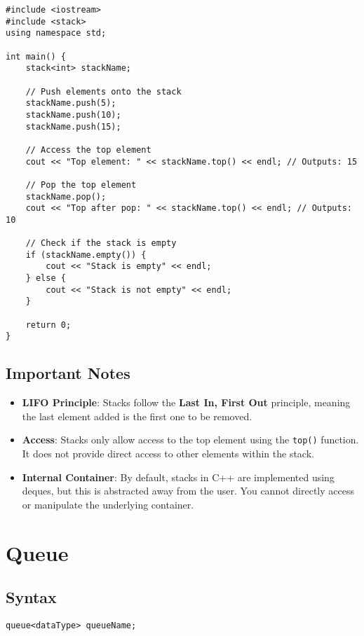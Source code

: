 \documentclass{article}
\begin{document}
\begin{lstlisting}
#include <iostream>
#include <stack>
using namespace std;

int main() {
    stack<int> stackName;
    
    // Push elements onto the stack
    stackName.push(5);
    stackName.push(10);
    stackName.push(15);
    
    // Access the top element
    cout << "Top element: " << stackName.top() << endl; // Outputs: 15
    
    // Pop the top element
    stackName.pop();
    cout << "Top after pop: " << stackName.top() << endl; // Outputs: 10
    
    // Check if the stack is empty
    if (stackName.empty()) {
        cout << "Stack is empty" << endl;
    } else {
        cout << "Stack is not empty" << endl;
    }
    
    return 0;
}
\end{lstlisting}

\subsection{Important Notes}

\begin{itemize}
    \item \textbf{LIFO Principle}: Stacks follow the \textbf{Last In, First Out} principle, meaning the last element added is the first one to be removed.
    \item \textbf{Access}: Stacks only allow access to the top element using the \texttt{top()} function. It does not provide direct access to other elements within the stack.
    \item \textbf{Internal Container}: By default, stacks in C++ are implemented using deques, but this is abstracted away from the user. You cannot directly access or manipulate the underlying container.
\end{itemize}

\newpage
\section{Queue}

\subsection{Syntax}

\begin{lstlisting}
queue<dataType> queueName; 
\end{lstlisting}
\end{document}
